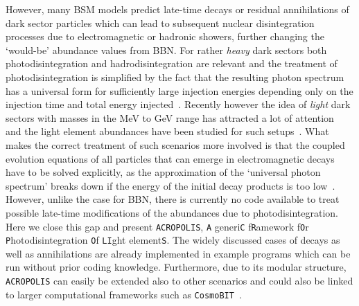 \documentclass[11pt,a4paper]{article}
\begin{document}
However, many BSM models predict late-time decays or residual annihilations of dark sector particles which can lead to
subsequent nuclear disintegration processes due to electromagnetic or hadronic showers, further changing the `would-be' abundance values from BBN.
For rather {\it heavy} dark sectors both photodisintegration and hadrodisintegration are relevant and the treatment of photodisintegration is simplified by the fact that
the resulting photon spectrum has a universal form for sufficiently large injection energies depending only on the injection time and total energy injected~\cite{Cyburt:2002uv}.
Recently however the idea of {\it light} dark sectors with masses in the MeV to GeV range has attracted a lot of attention~\cite{Batell:2009di,Andreas:2012mt,Schmidt-Hoberg:2013hba,Essig:2013vha,Izaguirre:2013uxa,Batell:2014mga,Dolan:2014ska,Krnjaic:2015mbs,Dolan:2017osp,Izaguirre:2017bqb,Knapen:2017xzo,Beacham:2019nyx,Bondarenko:2019vrb,Filimonova:2019tuy}
and the light element abundances have been studied
for such setups~\cite{Hufnagel:2017dgo,Hufnagel:2018bjp,Forestell:2018txr,Depta:2019lbe,Depta:2020wmr,Kawasaki:2020qxm}.
What makes the correct treatment of such scenarios more involved is that the coupled evolution equations of all particles that can emerge in electromagnetic decays have to be solved explicitly,
as the approximation of the `universal photon spectrum' breaks down if the energy of the initial decay products is too low~\cite{Poulin:2015opa}.
However, unlike the case for BBN, there is currently no code available to treat possible late-time modifications of the abundances due to photodisintegration.
Here we close this gap and present \texttt{ACROPOLIS}, \texttt{A} generi\texttt{C} f\texttt{R}amework f\texttt{O}r \texttt{P}hotodisintegration \texttt{O}f \texttt{LI}ght element\texttt{S}.
The widely discussed cases of decays as well as annihilations are already implemented in example programs which can be run without prior coding knowledge.
Furthermore, due to its modular structure, \texttt{ACROPOLIS} can easily be extended also to other scenarios and could also be linked to larger computational frameworks such as
\texttt{CosmoBIT}~\cite{Renk:2020hbs}.
\end{document}
